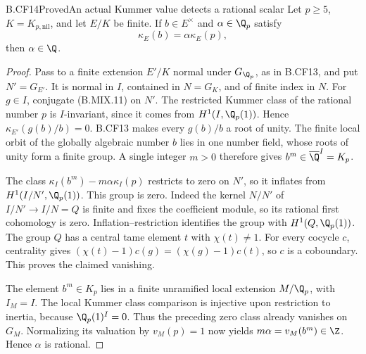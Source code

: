 \begin{claim}{B.CF14}{Proved}{An actual Kummer value detects a rational scalar}
Let \(p\geq5\), \(K=K_{p,\mathrm{nil}}\), and let \(E/K\)
be finite. If \(b\in E^\times\) and \(\alpha\in\Q_p\)
satisfy
\[
                 \kappa_E(b)=\alpha\kappa_E(p),           \tag{B.MIX.11}
\]
then \(\alpha\in\Q\).
\end{claim}
\begin{proof}
Pass to a finite extension \(E'/K\) normal under
\(G_{\Q_p}\), as in B.CF13, and put \(N'=G_{E'}\).
It is normal in \(I\), contained in \(N=G_K\), and of
finite index in \(N\). For \(g\in I\), conjugate (B.MIX.11)
on \(N'\). The restricted Kummer class of the rational
number \(p\) is \(I\)-invariant, since it comes from
\(H^1(I,\Q_p(1))\). Hence
\(\kappa_{E'}(g(b)/b)=0\). B.CF13 makes every
\(g(b)/b\) a root of unity. The finite local orbit of
the globally algebraic number \(b\) lies in one number
field, whose roots of unity form a finite group. A single
integer \(m>0\) therefore gives
\(b^m\in\overline\Q^I=K_p\).

The class
\(\kappa_I(b^m)-m\alpha\kappa_I(p)\) restricts to zero
on \(N'\), so it inflates from \(H^1(I/N',\Q_p(1))\).
This group is zero. Indeed the kernel \(N/N'\) of
\(I/N'\to I/N=Q\) is finite and fixes the coefficient
module, so its rational first cohomology is zero.
Inflation--restriction identifies the group with
\(H^1(Q,\Q_p(1))\). The group \(Q\) has a central
tame element \(t\) with \(\chi(t)\ne1\).
For every cocycle \(c\), centrality gives
\((\chi(t)-1)c(g)=(\chi(g)-1)c(t)\), so \(c\) is a
coboundary. This proves the claimed vanishing.

The element \(b^m\in K_p\) lies in a finite unramified
local extension \(M/\Q_p\), with \(I_M=I\).
The local Kummer class comparison is injective upon
restriction to inertia, because \(\Q_p(1)^I=0\).
Thus the preceding zero class already vanishes on
\(G_M\). Normalizing its valuation by \(v_M(p)=1\)
now yields
\(m\alpha=v_M(b^m)\in\Z\). Hence \(\alpha\) is rational.
\end{proof}

